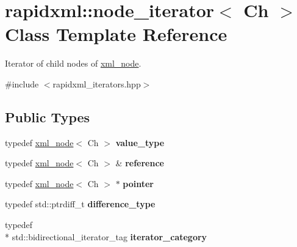 \hypertarget{classrapidxml_1_1node__iterator}{\section{rapidxml\+:\+:node\+\_\+iterator$<$ Ch $>$ Class Template Reference}
\label{classrapidxml_1_1node__iterator}
}


Iterator of child nodes of \hyperlink{singletonrapidxml_1_1xml__node}{xml\+\_\+node}.  




{\ttfamily \#include $<$rapidxml\+\_\+iterators.\+hpp$>$}

\subsection*{Public Types}
\begin{DoxyCompactItemize}
\item 
\hypertarget{classrapidxml_1_1node__iterator_ade6310119ed1f72c94830e006fac69b7}{typedef \hyperlink{singletonrapidxml_1_1xml__node}{xml\+\_\+node}$<$ Ch $>$ {\bfseries value\+\_\+type}}\label{classrapidxml_1_1node__iterator_ade6310119ed1f72c94830e006fac69b7}

\item 
\hypertarget{classrapidxml_1_1node__iterator_ad7fabbcb7d3d9e4e220299c5475b9e9c}{typedef \hyperlink{singletonrapidxml_1_1xml__node}{xml\+\_\+node}$<$ Ch $>$ \& {\bfseries reference}}\label{classrapidxml_1_1node__iterator_ad7fabbcb7d3d9e4e220299c5475b9e9c}

\item 
\hypertarget{classrapidxml_1_1node__iterator_a65dca8bca2b9c29f635b9ad0bdeeecb9}{typedef \hyperlink{singletonrapidxml_1_1xml__node}{xml\+\_\+node}$<$ Ch $>$ $\ast$ {\bfseries pointer}}\label{classrapidxml_1_1node__iterator_a65dca8bca2b9c29f635b9ad0bdeeecb9}

\item 
\hypertarget{classrapidxml_1_1node__iterator_a5bdc462b980a52c5fa2d99ac9f4f4bff}{typedef std\+::ptrdiff\+\_\+t {\bfseries difference\+\_\+type}}\label{classrapidxml_1_1node__iterator_a5bdc462b980a52c5fa2d99ac9f4f4bff}

\item 
\hypertarget{classrapidxml_1_1node__iterator_a8e82d75f768e17bf7349d010ee26c037}{typedef \\*
std\+::bidirectional\+\_\+iterator\+\_\+tag {\bfseries iterator\+\_\+category}}\label{classrapidxml_1_1node__iterator_a8e82d75f768e17bf7349d010ee26c037}

\end{DoxyCompactItemize}
